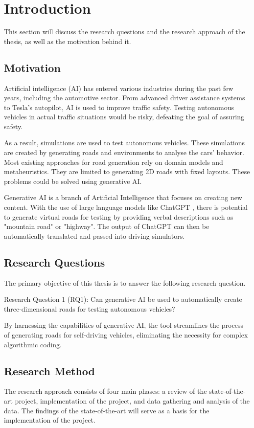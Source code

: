 \chapter{Introduction}\label{chap:introduction}


This section will discuss the research questions and the research approach of the
thesis, as well as the motivation behind it.

\section{Motivation}

Artificial intelligence (AI) has entered various industries during the past few years, including the automotive sector. From advanced driver assistance systems to Tesla's autopilot, AI is used to improve traffic safety. Testing autonomous vehicles in actual traffic situations would be risky, defeating the goal of assuring safety.

As a result, simulations are used to test autonomous vehicles. These simulations are created by generating roads and environments to analyse the cars' behavior. Most existing approaches for road generation rely on domain models and metaheuristics. They are limited to generating 2D roads with fixed layouts. These problems could be solved using generative AI.

Generative AI is a branch of Artificial Intelligence that focuses on creating new content. With the use of large language models like ChatGPT \cite{ChatGPT}, there is potential to generate virtual roads for testing by providing verbal descriptions such as "mountain road" or "highway". The output of ChatGPT can then be automatically translated and passed into driving simulators.

\section{Research Questions}
The primary objective of this thesis is to answer the following research question.

Research Question 1 (RQ1): Can generative AI be used to automatically create three-dimensional roads for testing autonomous vehicles?

By harnessing the capabilities of generative AI, the tool streamlines the process of generating roads for self-driving vehicles, eliminating the necessity for complex algorithmic coding.


\section{Research Method}
The research approach consists of four main phases: a review of the state-of-the-art project, implementation of the project, and data gathering and analysis of the data. The findings of the state-of-the-art will serve as a basis for the implementation of the project.


